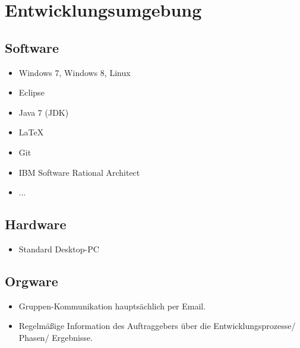 \chapter{Entwicklungsumgebung}
\section{Software}
\begin{itemize}
\item Windows 7, Windows 8, Linux
\item Eclipse
\item Java 7 (JDK)
\item \LaTeX
\item Git
\item IBM Software Rational Architect
\item ...
\end{itemize}


\section{Hardware}
\begin{itemize}
\item Standard Desktop-PC
\end{itemize}

\section{Orgware}
\begin{itemize}
\item Gruppen-Kommunikation hauptsächlich per Email.
\item Regelmäßige Information des Auftraggebers über die Entwicklungsprozesse/ Phasen/ Ergebnisse.
\end{itemize}
